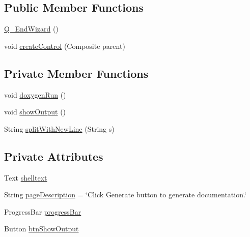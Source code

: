 \subsection*{Public Member Functions}
\begin{DoxyCompactItemize}
\item 
\hyperlink{classit_1_1isislab_1_1masonassisteddocumentation_1_1mason_1_1wizards_1_1_q___end_wizard_abc279fa31f6236a1af58d99df0eda1b9}{Q\-\_\-\-End\-Wizard} ()
\item 
void \hyperlink{classit_1_1isislab_1_1masonassisteddocumentation_1_1mason_1_1wizards_1_1_q___end_wizard_a3a0591b1e30644840d9828f5c67f8510}{create\-Control} (Composite parent)
\end{DoxyCompactItemize}
\subsection*{Private Member Functions}
\begin{DoxyCompactItemize}
\item 
void \hyperlink{classit_1_1isislab_1_1masonassisteddocumentation_1_1mason_1_1wizards_1_1_q___end_wizard_a42fd32637b3ac46154ab9c5ae720af05}{doxygen\-Run} ()
\item 
void \hyperlink{classit_1_1isislab_1_1masonassisteddocumentation_1_1mason_1_1wizards_1_1_q___end_wizard_a4564b1098ec942795cbd022ccbe338e0}{show\-Output} ()
\item 
String \hyperlink{classit_1_1isislab_1_1masonassisteddocumentation_1_1mason_1_1wizards_1_1_q___end_wizard_a89adac239da36e67abac1ec9c416bba4}{split\-With\-New\-Line} (String s)
\end{DoxyCompactItemize}
\subsection*{Private Attributes}
\begin{DoxyCompactItemize}
\item 
Text \hyperlink{classit_1_1isislab_1_1masonassisteddocumentation_1_1mason_1_1wizards_1_1_q___end_wizard_ac5e6042df131960cc6061862b2a7b8ce}{shelltext}
\item 
String \hyperlink{classit_1_1isislab_1_1masonassisteddocumentation_1_1mason_1_1wizards_1_1_q___end_wizard_a919473d7653dd931027f0f70f0c732ef}{page\-Description} = \char`\"{}Click Generate button to generate documentation.\char`\"{}
\item 
Progress\-Bar \hyperlink{classit_1_1isislab_1_1masonassisteddocumentation_1_1mason_1_1wizards_1_1_q___end_wizard_afe3af585753c6f0c523146360faa433c}{progress\-Bar}
\item 
Button \hyperlink{classit_1_1isislab_1_1masonassisteddocumentation_1_1mason_1_1wizards_1_1_q___end_wizard_ae2da7cbfbfd8b618427f5d7fa356a8a5}{btn\-Show\-Output}
\end{DoxyCompactItemize}
